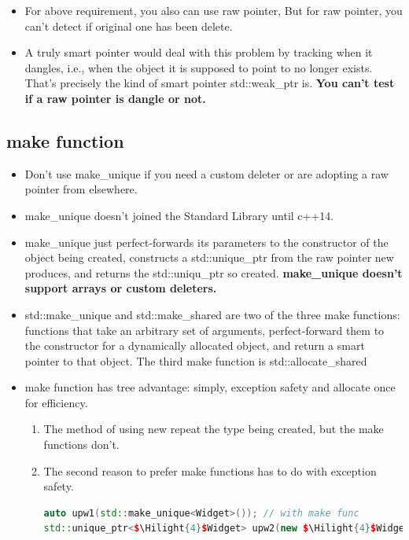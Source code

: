 \documentclass[a4paper,12pt,twoside]{book}
\newcommand{\Hilight}[1]{\makebox[0pt][l]{\color{yellow}\rule[-3pt]{#1em}{11pt}}}
\begin{document}
\begin{itemize}
\item For above requirement, you also can use raw pointer, But for raw pointer, you can't detect if original one has been delete. 

\item A truly smart pointer would deal with this problem by tracking
when it dangles, i.e., when the object it is supposed to point to no longer exists. That's
precisely the kind of smart pointer std::weak\_ptr is. \textbf{You can't test if a raw pointer is dangle or not.}


\end{itemize}

\subsection{make function}
\begin{itemize}

\item Don't use make\_unique if you need a custom deleter or are adopting a raw pointer from elsewhere.

\item make\_unique doesn't joined the Standard Library until c++14.

\item make\_unique just perfect-forwards its parameters to the constructor of the object being created, constructs a std::unique\_ptr from the raw pointer new produces, and returns the std::uniqu\_ptr so created. \textbf{make\_unique doesn't support arrays or custom deleters.}

\item std::make\_unique and std::make\_shared are two of the three make functions: functions that take an arbitrary set of arguments, perfect-forward them to the constructor for a dynamically allocated object, and return a smart pointer to that object. The third make function is std::allocate\_shared
\item make function has tree advantage: simply, exception safety and allocate once for efficiency.

\begin{enumerate}
\item The method of using new repeat the type being created, but the make functions don't.  

\item The second reason to prefer make functions has to do with exception safety.
\begin{lstlisting}[frame=single, language=c++, mathescape=true]
auto upw1(std::make_unique<Widget>()); // with make func
std::unique_ptr<$\Hilight{4}$Widget> upw2(new $\Hilight{4}$Widget); // without make func


\end{lstlisting}
\end{enumerate}
\end{itemize}
\end{document}
